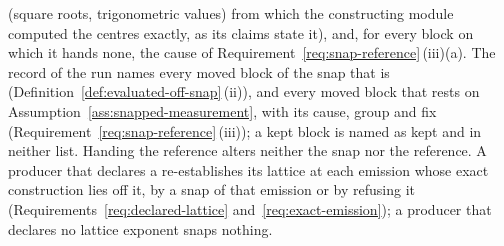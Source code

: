 \begin{requirement}
(square roots, trigonometric values) from which the constructing module
computed the centres exactly, as its claims state it), and, for every block
on which it hands none, the cause of
Requirement~\ref{req:snap-reference}\,(iii)(a). The record of the run names
every moved block of the snap that is 
(Definition~\ref{def:evaluated-off-snap}\,(ii)), and every moved block that
rests on Assumption~\ref{ass:snapped-measurement}, with its cause, group and
fix (Requirement~\ref{req:snap-reference}\,(iii)); a kept block is named as
kept and in neither list. Handing the reference alters neither the snap nor
the reference. A producer that declares a 
re-establishes its lattice at each emission whose exact construction lies off
it, by a snap of that emission or by refusing it
(Requirements~\ref{req:declared-lattice} and~\ref{req:exact-emission}); a
producer that declares no lattice exponent snaps nothing.
\end{requirement}
